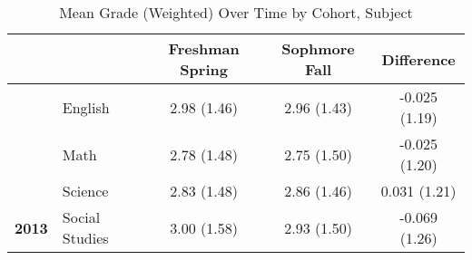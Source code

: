 \begin{table}[!h]

\caption{\label{tab:table_grade_desc}Mean Grade (Weighted) Over Time by Cohort, Subject}
\centering
\begin{tabular}[t]{>{}llccc}
\toprule
 &  & Freshman Spring & Sophmore Fall & Difference\\
\midrule
 & English & 2.98 (1.46) & 2.96 (1.43) & -0.025 (1.19)\\

 & Math & 2.78 (1.48) & 2.75 (1.50) & -0.025 (1.20)\\

 & Science & 2.83 (1.48) & 2.86 (1.46) & 0.031 (1.21)\\

\multirow{-4}{*}{\raggedright\arraybackslash \textbf{2013}} & Social Studies & 3.00 (1.58) & 2.93 (1.50) & -0.069 (1.26)\\
\bottomrule
\end{tabular}
\end{table}
